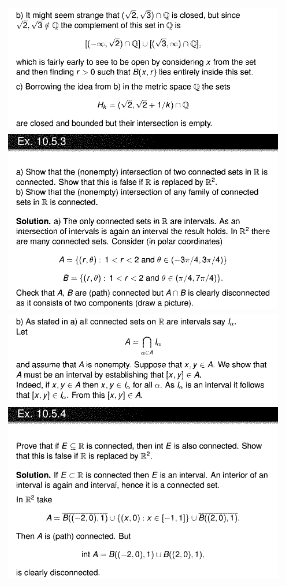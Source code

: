 \documentclass[8pt,landscape]{article}
\begin{document}
\begin{multicols}{3}
    \includegraphics[width=270]{Slides19.png} \\
    \includegraphics[width=270]{Slides20.png} \\
    \includegraphics[width=270]{Slides21.png} \\
    \includegraphics[width=270]{Slides22.png} \\

\end{multicols}
\end{document}
